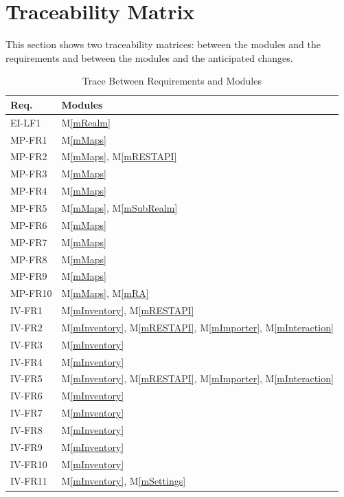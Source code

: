 \documentclass[12pt, titlepage]{article}
\newcommand{\mref}[1]{M\ref{#1}}
\begin{document}
\newpage

\section{Traceability Matrix} \label{SecTM}

This section shows two traceability matrices: between the modules and the
requirements and between the modules and the anticipated changes.

\begin{table}[H]
\centering
\begin{tabular}{p{} p{}}
\toprule
\textbf{Req.} & \textbf{Modules}\\
\midrule
EI-LF1 & \mref{mRealm}\\
MP-FR1 & \mref{mMaps}\\
MP-FR2 & \mref{mMaps}, \mref{mRESTAPI}\\
MP-FR3 & \mref{mMaps}\\
MP-FR4 & \mref{mMaps}\\
MP-FR5 & \mref{mMaps}, \mref{mSubRealm}\\
MP-FR6 & \mref{mMaps}\\
MP-FR7 & \mref{mMaps}\\
MP-FR8 & \mref{mMaps}\\
MP-FR9 & \mref{mMaps}\\
MP-FR10 & \mref{mMaps}, \mref{mRA}\\
IV-FR1 & \mref{mInventory}, \mref{mRESTAPI}\\
IV-FR2 & \mref{mInventory}, \mref{mRESTAPI}, \mref{mImporter}, \mref{mInteraction}\\
IV-FR3 & \mref{mInventory}\\
IV-FR4 & \mref{mInventory}\\
IV-FR5 & \mref{mInventory}, \mref{mRESTAPI}, \mref{mImporter}, \mref{mInteraction}\\
IV-FR6 & \mref{mInventory}\\
IV-FR7 & \mref{mInventory}\\
IV-FR8 & \mref{mInventory}\\
IV-FR9 & \mref{mInventory}\\
IV-FR10 & \mref{mInventory}\\
IV-FR11 & \mref{mInventory}, \mref{mSettings}\\
\bottomrule
\end{tabular}
\caption{Trace Between Requirements and Modules}
\label{TblRT}
\end{table}
\end{document}
